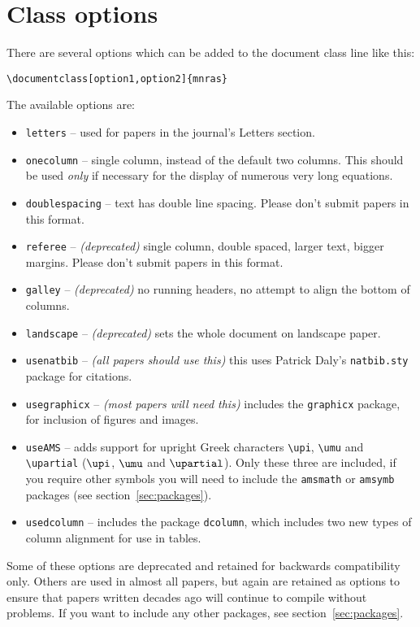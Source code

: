 \documentclass[fleqn,usenatbib,useAMS]{mnras}
\begin{document}
\section{Class options}
\label{sec:options}
There are several options which can be added to the document class line like this:

\begin{verbatim}
\documentclass[option1,option2]{mnras}
\end{verbatim}
The available options are:
\begin{itemize}
\item \verb'letters' -- used for papers in the journal's Letters section.
\item \verb'onecolumn' -- single column, instead of the default two columns. This should be used {\it only} if necessary for the display of numerous very long equations.
\item \verb'doublespacing' -- text has double line spacing. Please don't submit papers in this format.
\item \verb'referee' -- \textit{(deprecated)} single column, double spaced, larger text, bigger margins. Please don't submit papers in this format.
\item \verb'galley' -- \textit{(deprecated)} no running headers, no attempt to align the bottom of columns.
\item \verb'landscape' -- \textit{(deprecated)} sets the whole document on landscape paper.
\item \verb"usenatbib" -- \textit{(all papers should use this)} this uses Patrick Daly's \verb"natbib.sty" package for citations.
\item \verb"usegraphicx" -- \textit{(most papers will need this)} includes the \verb'graphicx' package, for inclusion of figures and images.
\item \verb'useAMS' -- adds support for upright Greek characters \verb'\upi', \verb'\umu' and \verb'\upartial' ($\upi$, $\umu$ and $\upartial$). Only these three are included, if you require other symbols you will need to include the \verb'amsmath' or \verb'amsymb' packages (see section~\ref{sec:packages}).
\item \verb"usedcolumn" -- includes the package \verb"dcolumn", which includes two new types of column alignment for use in tables.
\end{itemize}

Some of these options are deprecated and retained for backwards compatibility only.
Others are used in almost all papers, but again are retained as options to ensure that papers written decades ago will continue to compile without problems.
If you want to include any other packages, see section~\ref{sec:packages}.
\end{document}
